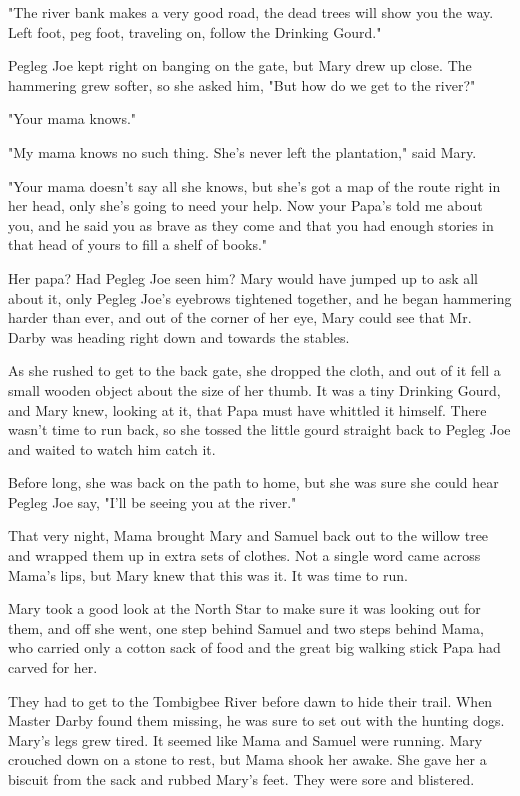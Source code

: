 "The river bank makes a very good road, the dead trees will show you the way. Left foot, peg foot, traveling on, follow the Drinking Gourd."

Pegleg Joe kept right on banging on the gate, but Mary drew up close. The hammering grew softer, so she asked him, "But how do we get to the river?"

"Your mama knows."

"My mama knows no such thing. She's never left the plantation," said Mary.

"Your mama doesn't say all she knows, but she's got a map of the route right in her head, only she's going to need your help. Now your Papa's told me about you, and he said you as brave as they come and that you had enough stories in that head of yours to fill a shelf of books."

Her papa? Had Pegleg Joe seen him? Mary would have jumped up to ask all about it, only Pegleg Joe's eyebrows tightened together, and he began hammering harder than ever, and out of the corner of her eye, Mary could see that Mr. Darby was heading right down and towards the stables.

As she rushed to get to the back gate, she dropped the cloth, and out of it fell a small wooden object about the size of her thumb. It was a tiny Drinking Gourd, and Mary knew, looking at it, that Papa must have whittled it himself. There wasn't time to run back, so she tossed the little gourd straight back to Pegleg Joe and waited to watch him catch it.

Before long, she was back on the path to home, but she was sure she could hear Pegleg Joe say, "I'll be seeing you at the river."

That very night, Mama brought Mary and Samuel back out to the willow tree and wrapped them up in extra sets of clothes. Not a single word came across Mama's lips, but Mary knew that this was it. It was time to run.

Mary took a good look at the North Star to make sure it was looking out for them, and off she went, one step behind Samuel and two steps behind Mama, who carried only a cotton sack of food and the great big walking stick Papa had carved for her.

They had to get to the Tombigbee River before dawn to hide their trail. When Master Darby found them missing, he was sure to set out with the hunting dogs. Mary's legs grew tired. It seemed like Mama and Samuel were running. Mary crouched down on a stone to rest, but Mama shook her awake. She gave her a biscuit from the sack and rubbed Mary's feet. They were sore and blistered.

